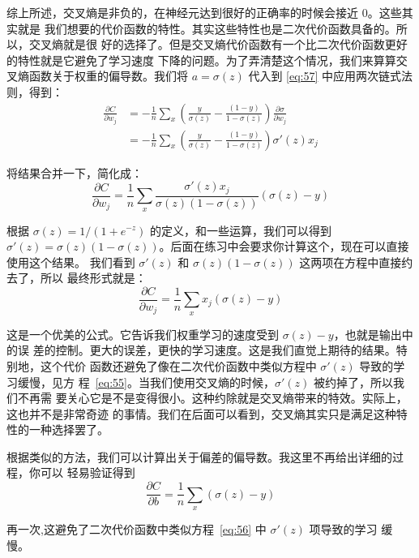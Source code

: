 综上所述，交叉熵是非负的，在神经元达到很好的正确率的时候会接近 $0$。这些其实就是
我们想要的代价函数的特性。其实这些特性也是二次代价函数具备的。所以，交叉熵就是很
好的选择了。但是交叉熵代价函数有一个比二次代价函数更好的特性就是它避免了学习速度
下降的问题。为了弄清楚这个情况，我们来算算交叉熵函数关于权重的偏导数。我们将
$a=\sigma(z)$ 代入到 \eqref{eq:57} 中应用两次链式法则，得到：
\begin{align}
  \frac{\partial C}{\partial w_j} &= -\frac{1}{n} \sum_x \left(
  \frac{y }{\sigma(z)} -\frac{(1-y)}{1-\sigma(z)} \right)
  \frac{\partial \sigma}{\partial w_j} \label{eq:58}\tag{58}\\
  &= -\frac{1}{n} \sum_x \left(
  \frac{y}{\sigma(z)}
  -\frac{(1-y)}{1-\sigma(z)} \right)\sigma'(z) x_j \label{eq:59}\tag{59}
\end{align}

将结果合并一下，简化成：
\begin{equation}
  \frac{\partial C}{\partial w_j} = \frac{1}{n} \sum_x \frac{\sigma'(z)
    x_j}{\sigma(z) (1-\sigma(z))} (\sigma(z)-y)
\label{eq:60}\tag{60}
\end{equation}

根据 $\sigma(z) = 1/(1+e^{-z})$ 的定义，和一些运算，我们可以得到 $\sigma'(z) =
\sigma(z)(1-\sigma(z))$。后面在练习中会要求你计算这个，现在可以直接使用这个结果。
我们看到 $\sigma'(z)$ 和 $\sigma(z)(1-\sigma(z))$ 这两项在方程中直接约去了，所以
最终形式就是：
\begin{equation}
  \frac{\partial C}{\partial w_j} =  \frac{1}{n} \sum_x x_j(\sigma(z)-y)
\label{eq:61}\tag{61}
\end{equation}

这是一个优美的公式。它告诉我们权重学习的速度受到 $\sigma(z)-y$，也就是输出中的误
差的控制。更大的误差，更快的学习速度。这是我们直觉上期待的结果。特别地，这个代价
函数还避免了像在二次代价函数中类似方程中 $\sigma'(z)$ 导致的学习缓慢，见方
程~\eqref{eq:55}。当我们使用交叉熵的时候，$\sigma'(z)$ 被约掉了，所以我们不再需
要关心它是不是变得很小。这种约除就是交叉熵带来的特效。实际上，这也并不是非常奇迹
的事情。我们在后面可以看到，交叉熵其实只是满足这种特性的一种选择罢了。

根据类似的方法，我们可以计算出关于偏差的偏导数。我这里不再给出详细的过程，你可以
轻易验证得到
\begin{equation}
  \frac{\partial C}{\partial b} = \frac{1}{n} \sum_x (\sigma(z)-y)
\label{eq:62}\tag{62}
\end{equation}

再一次,这避免了二次代价函数中类似方程~\eqref{eq:56} 中 $\sigma'(z)$ 项导致的学习
缓慢。

